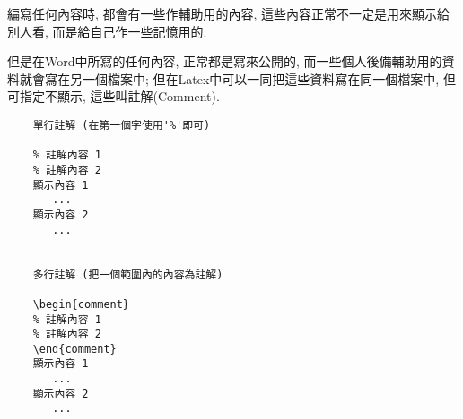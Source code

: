 
編寫任何內容時, 都會有一些作輔助用的內容, 這些內容正常不一定是用來顯示給別人看, 而是給自己作一些記憶用的.

但是在Word中所寫的任何內容, 正常都是寫來公開的, 而一些個人後備輔助用的資料就會寫在另一個檔案中; 但在Latex中可以一同把這些資料寫在同一個檔案中, 但可指定不顯示, 這些叫註解(Comment).

\begin{framed}
  \begin{verbatim}
    單行註解 (在第一個字使用'%'即可)

    % 註解內容 1
    % 註解內容 2
    顯示內容 1
       ...
    顯示內容 2
       ...
    

    多行註解 (把一個範圍內的內容為註解)

    \begin{comment}
    % 註解內容 1
    % 註解內容 2
    \end{comment}
    顯示內容 1
       ...
    顯示內容 2
       ...
  \end{verbatim}
\end{framed}

